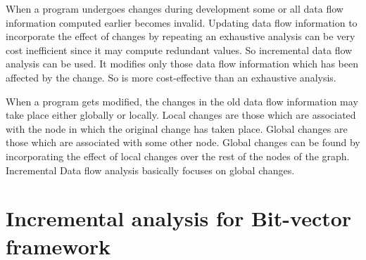 \documentclass[11pt,a4paper,openright]{report}
\begin{document}
When a program undergoes changes during development some or all data flow information computed earlier becomes invalid. 
Updating data flow information to incorporate the effect of changes by repeating an exhaustive analysis can be very cost inefficient since
it may compute redundant values. So incremental data flow analysis can be used. It modifies only those data flow information which has been
affected by the change. So is more cost-effective than an exhaustive analysis.

When a program gets modified, the changes in the old data flow information may take place either globally or locally. Local changes
are those which are associated with the node in which the original change has taken place. Global changes are those which are associated with some
other node. Global changes can be found by incorporating the effect of local changes over the rest of the nodes of the graph. Incremental Data flow
analysis basically focuses on global changes.


\section{Incremental analysis for Bit-vector framework}
\end{document}
